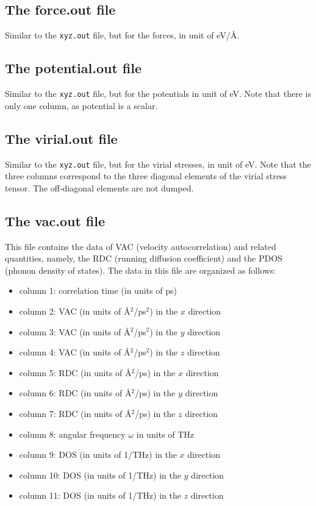 \documentclass[12pt,a4paper]{report}
\begin{document}
\subsection{The force.out file}

Similar to the \verb"xyz.out" file, but for the forces, in unit of eV/\AA.

\subsection{The potential.out file}

Similar to the \verb"xyz.out" file, but for the potentials in unit of eV. Note that there is
only one column, as potential is a scalar.

\subsection{The virial.out file}

Similar to the \verb"xyz.out" file, but for the virial stresses, in unit of eV.
Note that the three columns correspond to the three diagonal elements
of the virial stress tensor. The off-diagonal elements are not dumped.



\subsection{The vac.out file}
This file contains the data of VAC (velocity autocorrelation) and related quantities, namely, the RDC (running diffusion coefficient) and the PDOS (phonon density of states). The data in this file are organized as follows:
\begin{itemize}
\item column 1: correlation time (in units of ps)
\item column 2: VAC (in units of \AA$^2$/ps$^2$) in the $x$ direction
\item column 3: VAC (in units of \AA$^2$/ps$^2$) in the $y$ direction
\item column 4: VAC (in units of \AA$^2$/ps$^2$) in the $z$ direction
\item column 5: RDC (in units of \AA$^2$/ps) in the $x$ direction
\item column 6: RDC (in units of \AA$^2$/ps) in the $y$ direction
\item column 7: RDC (in units of \AA$^2$/ps) in the $z$ direction
\item column 8: angular frequency $\omega$ in units of THz
\item column 9: DOS (in units of 1/THz) in the $x$ direction
\item column 10: DOS (in units of 1/THz) in the $y$ direction
\item column 11: DOS (in units of 1/THz) in the $z$ direction
\end{itemize}
\end{document}
